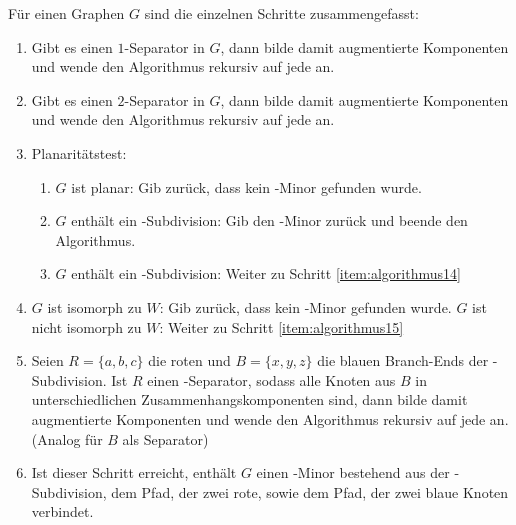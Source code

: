 \newpage
Für einen Graphen $G$ sind die einzelnen Schritte zusammengefasst:
\begin{enumerate}
  \item \label{item:algorithmus11} Gibt es einen $1$-Separator in $G$, dann bilde damit augmentierte Komponenten und wende den Algorithmus rekursiv auf jede an.
  \item \label{item:algorithmus12} Gibt es einen $2$-Separator in $G$, dann bilde damit augmentierte Komponenten und wende den Algorithmus rekursiv auf jede an.
  \item \label{item:algorithmus13} Planaritätstest:
                                   \begin{enumerate}
                                     \item $G$ ist planar: Gib zurück, dass kein \kf-Minor gefunden wurde.
                                     \item $G$ enthält ein \kf-Subdivision: Gib den \kf-Minor zurück und beende den Algorithmus.
                                     \item $G$ enthält ein \kdd-Subdivision: Weiter zu Schritt \ref{item:algorithmus14}
                                   \end{enumerate}
  \item \label{item:algorithmus14} $G$ ist isomorph zu $W$: Gib zurück, dass kein \kf-Minor gefunden wurde.
                                   $G$ ist nicht isomorph zu $W$: Weiter zu Schritt \ref{item:algorithmus15}
  \item \label{item:algorithmus15} Seien $R = \{a, b, c\}$ die roten und $B = \{x, y, z\}$ die blauen Branch-Ends der \kdd-Subdivision.
                                   Ist $R$ einen \dd-Separator, sodass alle Knoten aus $B$ in unterschiedlichen Zusammenhangskomponenten sind, dann bilde damit augmentierte Komponenten und wende den Algorithmus rekursiv auf jede an.
                                   (Analog für $B$ als Separator)
  \item \label{item:algorithmus16} Ist dieser Schritt erreicht, enthält $G$ einen \kf-Minor bestehend aus der \kdd-Subdivision, dem Pfad, der zwei rote, sowie dem Pfad, der zwei blaue Knoten verbindet.
\end{enumerate}

